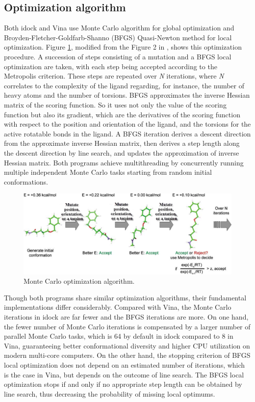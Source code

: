 \subsection{Optimization algorithm}

Both idock and Vina use Monte Carlo algorithm for global optimization and Broyden-Fletcher-Goldfarb-Shanno (BFGS) \citep{786} Quasi-Newton method for local optimization. Figure \ref{idock:MonteCarlo}, modified from the Figure 2 in \citep{493}, shows this optimization procedure. A succession of steps consisting of a mutation and a BFGS local optimization are taken, with each step being accepted according to the Metropolis criterion. These steps are repeated over \textit{N} iterations, where \textit{N} correlates to the complexity of the ligand regarding, for instance, the number of heavy atoms and the number of torsions. BFGS approximates the inverse Hessian matrix of the scoring function. So it uses not only the value of the scoring function but also its gradient, which are the derivatives of the scoring function with respect to the position and orientation of the ligand, and the torsions for the active rotatable bonds in the ligand. A BFGS iteration derives a descent direction from the approximate inverse Hessian matrix, then derives a step length along the descent direction by line search, and updates the approximation of inverse Hessian matrix. Both programs achieve multithreading by concurrently running multiple independent Monte Carlo tasks starting from random initial conformations.

\begin{figure}
\centering
\includegraphics[width=\linewidth]{../idock/MonteCarlo.png}
\caption{Monte Carlo optimization algorithm.}
\label{idock:MonteCarlo}
\end{figure}

Though both programs share similar optimization algorithms, their fundamental implementations differ considerably. Compared with Vina, the Monte Carlo iterations in idock are far fewer and the BFGS iterations are more. On one hand, the fewer number of Monte Carlo iterations is compensated by a larger number of parallel Monte Carlo tasks, which is 64 by default in idock compared to 8 in Vina, guaranteeing better conformational diversity and higher CPU utilization on modern multi-core computers. On the other hand, the stopping criterion of BFGS local optimization does not depend on an estimated number of iterations, which is the case in Vina, but depends on the outcome of line search. The BFGS local optimization stops if and only if no appropriate step length can be obtained by line search, thus decreasing the probability of missing local optimums.

